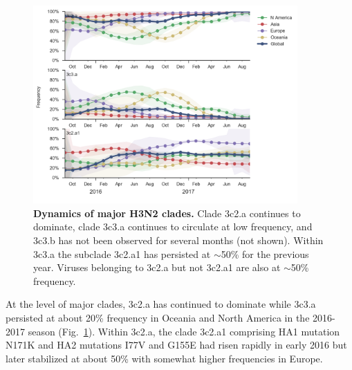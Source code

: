 \documentclass[11pt,oneside,letterpaper]{article}
\newcommand{\FIG}[1]{Fig.~\ref{#1}}
\begin{document}
\clearpage
\begin{figure}[H]
  \centering
  \includegraphics[width=0.9\textwidth]{../figures/sep-2017/h3n2_clades.png}
  \caption{\textbf{Dynamics of major H3N2 clades.} Clade 3c2.a continues to dominate, clade 3c3.a continues to circulate at low frequency, and 3c3.b has not been observed for several months (not shown). Within 3c3.a the subclade 3c2.a1 has persisted at $\sim$50\% for the previous year. Viruses belonging to 3c2.a but not 3c2.a1 are also at $\sim$50\% frequency.}
  \label{h3n2_clades}
\end{figure}
At the level of major clades, 3c2.a has continued to dominate while
3c3.a persisted at about 20\% frequency in Oceania and North America in
the 2016-2017 season (\FIG{h3n2_clades}). Within 3c2.a, the clade 3c2.a1 comprising HA1
mutation N171K and HA2 mutations I77V and G155E had risen rapidly in
early 2016 but later stabilized at about 50\% with somewhat higher
frequencies in Europe.
\end{document}

